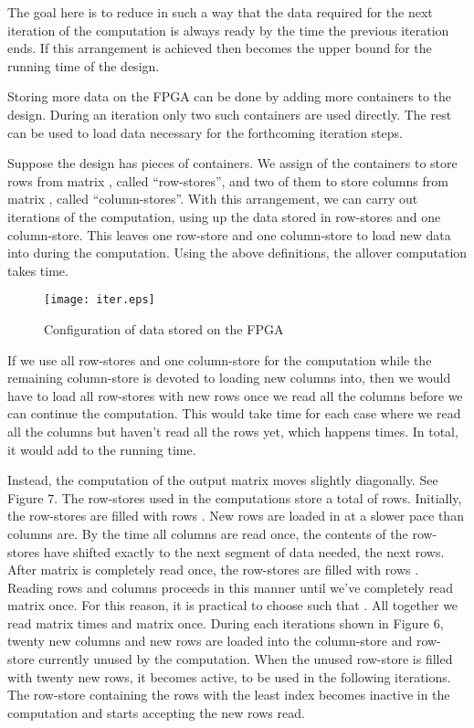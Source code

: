 \documentclass[11pt,twoside]{article}
\begin{document}
The goal here is to reduce  in such a way that the data required for the next iteration of the computation is always ready by the time the previous iteration ends. If this arrangement is achieved then  becomes the upper bound for the running time of the design.

Storing more data on the FPGA can be done by adding more  containers to the design. During an iteration only two such containers are used directly. The rest can be used to load data necessary for the forthcoming iteration steps.

Suppose the design has  pieces of  containers. We assign  of the containers to store rows from matrix , called ``row-stores'', and two of them to store columns from matrix , called ``column-stores''. With this arrangement, we can carry out  iterations of the computation, using up the data stored in  row-stores and one column-store. This leaves one row-store and one column-store to load new data into during the computation. Using the above definitions, the allover computation takes  time.

\begin{figure}[h!]
\centering
\texttt{[image: iter.eps]}
\caption{Configuration of data stored on the FPGA}
\end{figure}

If we use all  row-stores and one column-store for the computation while the remaining column-store is devoted to loading new columns into, then we would have to load all  row-stores with new rows once we read all the columns before we can continue the computation. This would take  time for each case where we read all the columns but haven't read all the rows yet, which happens  times. In total, it would add  to the running time.

Instead, the computation of the output matrix moves slightly diagonally. See Figure 7. The  row-stores used in the computations store a total of  rows. Initially, the row-stores are filled with rows . New rows are loaded in at a slower pace than columns are. By the time all columns are read once, the contents of the row-stores have shifted exactly to the next segment of data needed, the next  rows. After matrix  is completely read once, the row-stores are filled with rows . Reading rows and columns proceeds in this manner until we've completely read matrix  once. For this reason, it is practical to choose  such that . All together we read matrix   times and matrix  once. During each  iterations shown in Figure 6, twenty new columns and  new rows are loaded into the column-store and row-store currently unused by the computation. When the unused row-store is filled with twenty new rows, it becomes active, to be used in the following iterations. The row-store containing the rows with the least index becomes inactive in the computation and starts accepting the new rows read.
\end{document}
